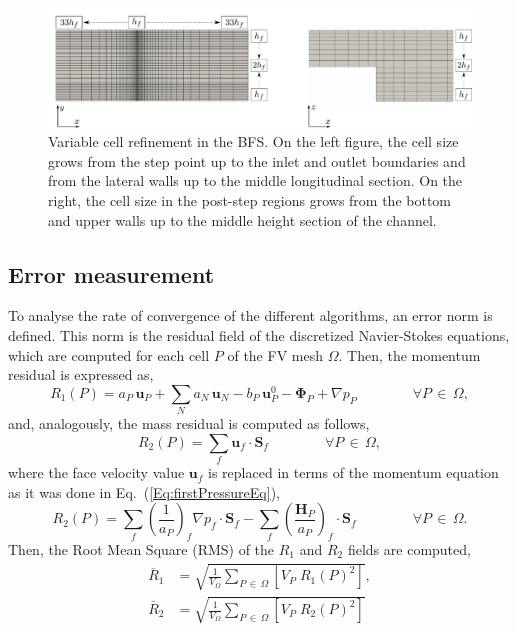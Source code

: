 \documentclass[final,3p,times,11pt,onecolumn]{myElsarticle}
\numberwithin{equation}{section}
\begin{document}
\begin{figure}[t!!!]
\centering
\includegraphics[width=16cm]{fig/Cases/Factores.pdf}
\caption{Variable cell refinement in the BFS.  On the left figure, the cell size grows from the step point up to the inlet and outlet boundaries and from the lateral walls up to the middle longitudinal section. On the right, the cell size in the post-step regions grows from the bottom and upper walls up to the middle height section of the channel.}
\label{Fig:Factores}
\end{figure}

\subsection{Error measurement}
To analyse the rate of convergence of the different algorithms, an error norm is defined. This norm is the residual field of the discretized Navier-Stokes equations, which are computed for each cell $P$ of the FV mesh $\Omega$. Then, the momentum residual is expressed as,
\begin{equation}
\label{Eq:R1Discretized}
R_1(P)
=
a_P\,\boldsymbol{u}_P + \sum_{N} a_{N}\,\boldsymbol{u}_{N} 
-b_P\, \boldsymbol{u}^0_P - \boldsymbol{\Phi}_P + \nabla p_P
\qquad \qquad \forall P\,\in\,\Omega,
\end{equation}
and, analogously, the mass residual is computed as follows,
\begin{equation}
R_2(P)
=
\sum_f
\boldsymbol{u}_f
\cdot
\boldsymbol{S}_f
\qquad \qquad
\forall P\,\in\,\Omega,
\end{equation}
where the face velocity value $\boldsymbol{u}_f$ is replaced in terms of the momentum equation as it was done in Eq.~(\ref{Eq:firstPressureEq}),
\begin{equation}
\label{Eq:R2Discretized}
R_2(P)
=
\sum_f 
\left(
\frac{1}{a_P}
\right)_f 
\nabla p_f
\cdot
\boldsymbol{S}_f 
-
\sum_f
\left(
\frac{\boldsymbol{H}_P}
{a_P}
\right)_f 
\cdot 
\boldsymbol{S}_f
\qquad \qquad
\forall P\,\in\,\Omega.
\end{equation}
Then, the Root Mean Square (RMS) of the $R_1$ and $R_2$ fields are computed,
\begin{align}
\overline{R}_1
&=
\sqrt
{
\frac{1}{V_\Omega}
\sum_{P\,\in\,\Omega}
\left[V_P\;R_1(P)^2\right]
},
\\
\overline{R}_2
&=
\sqrt
{
\frac{1}{V_\Omega}
\sum_{P\,\in\,\Omega}
\left[V_P\;R_2(P)^2\right]
}
\end{align}
\end{document}
